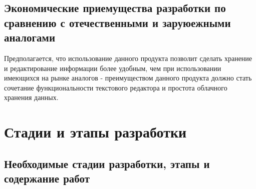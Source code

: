 \subsection{Экономические приемущества разработки по сравнению с отечественными и заруюежными аналогами}
Предполагается, что использование данного продукта позволит сделать хранение и редактирование информации более удобным, чем при использовании имеющихся на рынке аналогов - преимуществом данного продукта должно стать сочетание функциональности текстового редактора и простота облачного хранения данных.

\section{Стадии и этапы разработки}

\subsection{Необходимые стадии разработки, этапы и содержание работ}

